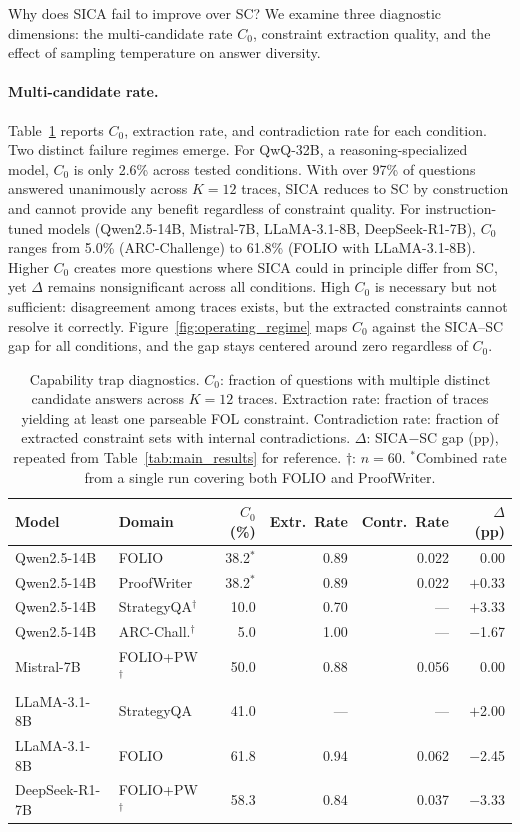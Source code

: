 Why does SICA fail to improve over SC? We examine three diagnostic dimensions: the multi-candidate rate $C_0$, constraint extraction quality, and the effect of sampling temperature on answer diversity.

\paragraph{Multi-candidate rate.} Table~\ref{tab:capability_trap} reports $C_0$, extraction rate, and contradiction rate for each condition. Two distinct failure regimes emerge. For QwQ-32B, a reasoning-specialized model, $C_0$ is only 2.6\% across tested conditions. With over 97\% of questions answered unanimously across $K=12$ traces, SICA reduces to SC by construction and cannot provide any benefit regardless of constraint quality. For instruction-tuned models (Qwen2.5-14B, Mistral-7B, LLaMA-3.1-8B, DeepSeek-R1-7B), $C_0$ ranges from 5.0\% (ARC-Challenge) to 61.8\% (FOLIO with LLaMA-3.1-8B). Higher $C_0$ creates more questions where SICA could in principle differ from SC, yet $\Delta$ remains nonsignificant across all conditions. High $C_0$ is necessary but not sufficient: disagreement among traces exists, but the extracted constraints cannot resolve it correctly. Figure~\ref{fig:operating_regime} maps $C_0$ against the SICA--SC gap for all conditions, and the gap stays centered around zero regardless of $C_0$.

\begin{table}[t]
\centering
\small
\caption{Capability trap diagnostics. $C_0$: fraction of questions with multiple distinct candidate answers across $K=12$ traces. Extraction rate: fraction of traces yielding at least one parseable FOL constraint. Contradiction rate: fraction of extracted constraint sets with internal contradictions. $\Delta$: SICA$-$SC gap (pp), repeated from Table~\ref{tab:main_results} for reference. $\dagger$: $n=60$. $^*$Combined rate from a single run covering both FOLIO and ProofWriter.}
\label{tab:capability_trap}
\begin{tabular}{@{}llrrrr@{}}
\toprule
Model & Domain & $C_0$ (\%) & Extr.\ Rate & Contr.\ Rate & $\Delta$ (pp) \\
\midrule
Qwen2.5-14B & FOLIO & 38.2$^*$ & 0.89 & 0.022 & 0.00 \\
Qwen2.5-14B & ProofWriter & 38.2$^*$ & 0.89 & 0.022 & $+$0.33 \\
Qwen2.5-14B & StrategyQA$^\dagger$ & 10.0 & 0.70 & --- & $+$3.33 \\
Qwen2.5-14B & ARC-Chall.$^\dagger$ & 5.0 & 1.00 & --- & $-$1.67 \\
Mistral-7B & FOLIO+PW$^\dagger$ & 50.0 & 0.88 & 0.056 & 0.00 \\
LLaMA-3.1-8B & StrategyQA & 41.0 & --- & --- & $+$2.00 \\
LLaMA-3.1-8B & FOLIO & 61.8 & 0.94 & 0.062 & $-$2.45 \\
DeepSeek-R1-7B & FOLIO+PW$^\dagger$ & 58.3 & 0.84 & 0.037 & $-$3.33 \\
\bottomrule
\end{tabular}
\end{table}

